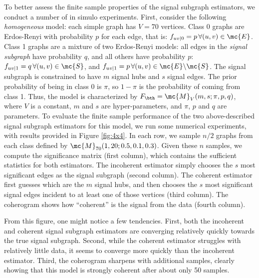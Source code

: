 \documentclass[10pt,journal,cspaper,compsoc]{IEEEtran}
\begin{document}
To better assess the finite sample properties of the signal subgraph estimators, we conduct a number of in simulo experiments.  First, consider the following \emph{homogeneous} model: each simple graph has $V=70$ vertices.  Class 0 graphs are Erdos-Renyi with probability $p$ for each edge, that is: $f_{uv|0}=p \, \forall (u,v) \in \mc{E}$.  Class 1 graphs are a mixture of two Erdos-Renyi models: all edges in the \emph{signal subgraph} have probability $q$, and all others have probability $p$: $f_{uv|1}=q \, \forall (u,v) \in \mc{S}$, and $f_{uv|1}=p \, \forall (u,v) \in \mc{E} \backslash \mc{S}$.  The signal subgraph is constrained to have $m$ signal hubs and $s$ signal edges.  The prior probability of being in class 0 is $\pi$, so $1-\pi$ is the probability of coming from class 1. Thus, the model is characterized by $F_{\bth}=\mc{M}_V(m,s; \pi,p,q)$, where $V$ is a constant, $m$ and $s$ are hyper-parameters, and $\pi$, $p$ and $q$ are parameters.  To evaluate the finite sample performance of the two above-described signal subgraph estimators for this model, we run some numerical experiments, with results provided in Figure \ref{fig:4x4}.  In each row, we sample $n/2$ graphs from each class defined by $\mc{M}_{70}(1,20;0.5,0.1,0.3)$.  Given these $n$ samples, we compute the significance matrix (first column), which contains the sufficient statistics for both estimators.  The incoherent estimator simply chooses the $s$ most significant edges as the signal subgraph (second column). The coherent estimator first guesses which are  the $m$ signal hubs, and then chooses the $s$ most significant signal edges incident to at least one of those vertices (third column).  The coherogram shows how ``coherent'' is the signal from the data (fourth column).    

From this figure, one might notice a few tendencies.  First, both the incoherent and coherent signal subgraph estimators are converging relatively quickly towards the true signal subgraph.  Second, while the coherent estimator struggles with relatively little data, it seems to converge more quickly than the incoherent estimator.  Third, the coherogram sharpens with additional samples, clearly showing that this model is strongly coherent after about only 50 samples.
\end{document}
